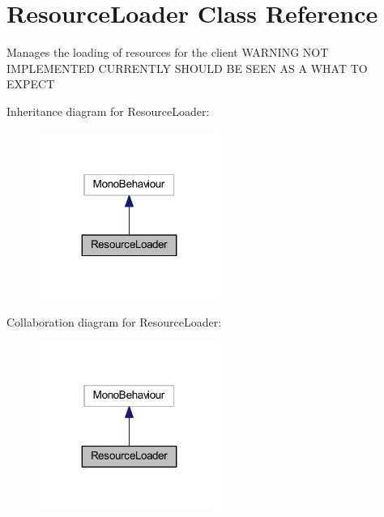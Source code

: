 \hypertarget{class_resource_loader}{}\section{Resource\+Loader Class Reference}
\label{class_resource_loader}


Manages the loading of resources for the client W\+A\+R\+N\+I\+NG N\+OT I\+M\+P\+L\+E\+M\+E\+N\+T\+ED C\+U\+R\+R\+E\+N\+T\+LY S\+H\+O\+U\+LD BE S\+E\+EN AS A W\+H\+AT TO E\+X\+P\+E\+CT  




Inheritance diagram for Resource\+Loader\+:
\nopagebreak
\begin{figure}[H]
\begin{center}
\leavevmode
\includegraphics[width=167pt]{class_resource_loader__inherit__graph}
\end{center}
\end{figure}


Collaboration diagram for Resource\+Loader\+:
\nopagebreak
\begin{figure}[H]
\begin{center}
\leavevmode
\includegraphics[width=167pt]{class_resource_loader__coll__graph}
\end{center}
\end{figure}
